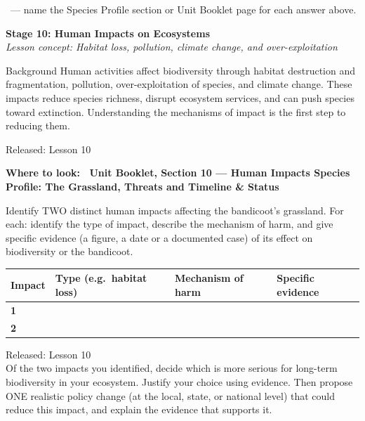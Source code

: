 \documentclass[11pt,a4paper]{article}
\newcommand{\wheretolook}[1]{%
  \par\vspace{2pt}\noindent
  \colorbox{GoldLight}{\parbox{\dimexpr\linewidth-2\fboxsep\relax}{%
    \small\color{GoldDark}\headingfont\bfseries Where to look:\ %
    \normalfont\color{DarkGrey}#1}}\par\vspace{4pt}}
\newcommand{\answerbox}[1]{%
  \begin{tcolorbox}[
    enhanced, breakable, arc=2mm,
    colback=Paper, colframe=Line,
    left=2mm, right=2mm, top=1mm, bottom=1mm,
    boxrule=1pt, height=#1
  ]
  \end{tcolorbox}%
}
\newcommand{\stagediv}[3]{%
  \needspace{6\baselineskip}
  \begin{tcolorbox}[
    enhanced, breakable=false, arc=3.5mm,
    colback=ForestDark, colframe=ForestDark, boxrule=0pt,
    sidebyside, sidebyside align=center,
    lefthand width=2.2cm,
    left=2mm, right=4mm, top=4mm, bottom=4mm
  ]
    \begin{center}
      {\headingfont\bfseries\color{Forest!35!ForestDark}\fontsize{42}{42}\selectfont #1}
    \end{center}
    \tcblower
    {\headingfont\bfseries\color{white}\large Stage #1: #2}\\[3pt]
    {\itshape\color{white!75!ForestDark}\small Lesson concept: #3}
  \end{tcolorbox}%
  \vspace{6pt}%
}
\newcommand{\yr}[2]{\noindent{\headingfont\bfseries\small\color{Forest}%
  \rule[0.2ex]{1.2em}{2pt}\hspace{4pt}#1}\hfill{\small\color{DarkGrey}#2}\\[2pt]}
\newcommand{\yrviii}[2]{\noindent{\headingfont\bfseries\small\color{Violet}%
  \rule[0.2ex]{1.2em}{2pt}\hspace{4pt}#1}\hfill{\small\color{DarkGrey}#2}\\[2pt]}
\begin{document}
\bigskip{}
{\small\color{DarkGrey}\ --- name the Species Profile section or Unit Booklet page for each answer above.}
\answerbox{1.5cm}

\newpage

\stagediv{10}{Human Impacts on Ecosystems}{Habitat loss, pollution, climate change, and over-exploitation}

\begin{contextbox}{Background}
Human activities affect biodiversity through habitat destruction and fragmentation, pollution, over-exploitation of species, and climate change. These impacts reduce species richness, disrupt ecosystem services, and can push species toward extinction. Understanding the mechanisms of impact is the first step to reducing them.
\end{contextbox}

\bigskip

\begin{yr7box}
\yr{At The Level}{Released: Lesson 10}

\wheretolook{Unit Booklet, Section 10 --- Human Impacts \textbullet{} \textbf{Species Profile: The Grassland}, \textbf{Threats} and \textbf{Timeline \& Status}}
Identify TWO distinct human impacts affecting the bandicoot's grassland. For each: identify the type of impact, describe the mechanism of harm, and give specific evidence (a figure, a date or a documented case) of its effect on biodiversity or the bandicoot.

\medskip
\noindent\begin{tabularx}{\linewidth}{|>{\bfseries}p{1.5cm}|p{3cm}|p{4.5cm}|X|}
  \hline
  \rowcolor{TableHead}
  \headingfont\bfseries\color{white} Impact &
  \headingfont\bfseries\color{white} Type \quad (e.g.\ habitat loss) &
  \headingfont\bfseries\color{white} Mechanism of harm &
  \headingfont\bfseries\color{white} Specific evidence \\
  \hline
  1 & & & \\[160pt]
  \hline
  \rowcolor{RowAlt}
  2 & & & \\[160pt]
  \hline
\end{tabularx}
\end{yr7box}

\bigskip
\newpage
\begin{yr8box}
\yrviii{Above The Level}{Released: Lesson 10}
Of the two impacts you identified, decide which is more serious for long-term biodiversity in your ecosystem. Justify your choice using evidence. Then propose ONE realistic policy change (at the local, state, or national level) that could reduce this impact, and explain the evidence that supports it.
\answerbox{15cm}
\end{yr8box}
\end{document}
